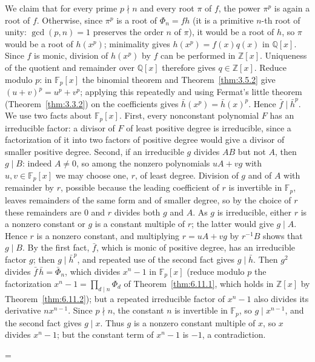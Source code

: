 \documentclass[11pt]{article}
\makeatletter
\let\nt@closedisplay\]
\def\nt@guardedclose{\@ifnextchar\par{\nt@closeafterpar}{\@ifnextchar\end{\postdisplaypenalty\@M\nt@closedisplay}{\nt@closedisplay}}}
\def\nt@closeafterpar\par{\@ifnextchar\par{\nt@closeafterpar}{\@ifnextchar\end{\postdisplaypenalty\@M\nt@closedisplay\par}{\nt@closedisplay\par}}}
\renewenvironment{proof}[1][\proofname]{\par
  \pushQED{\qed}\normalfont\topsep\medskipamount\edef\nt@afterproof{\@endparpenalty=\the\@endparpenalty\relax}\@beginparpenalty\@M\@endparpenalty\@M\let\]\nt@guardedclose\trivlist\item[]\textit{#1\@addpunct{.}} \ignorespaces}{\ifvmode\addpenalty\@M\fi\popQED\nt@afterproof\endtrivlist\@endpefalse}
\theoremstyle{ntstyle}
\makeatother
\begin{document}
\begin{proof}
  We claim that for every prime $p\nmid n$ and every root $\pi$ of $f$,
  the power $\pi^{p}$ is again a root of $f$. Otherwise, since $\pi^{p}$ is a
  root of $\Phi_n = fh$ (it is a primitive $n$-th root of unity:
  $\gcd(p, n) = 1$ preserves the order $n$ of $\pi$), it would be a
  root of $h$, so $\pi$ would be a root of $h(x^{p})$; minimality
  gives $h(x^{p})=f(x)q(x)$ in $\mathbb{Q}[x]$. Since $f$ is monic,
  division of $h(x^p)$ by $f$ can be performed in $\mathbb{Z}[x]$.
  Uniqueness of the quotient and remainder over $\mathbb{Q}[x]$ therefore
  gives $q\in\mathbb{Z}[x]$. Reduce modulo $p$:
  in $\mathbb{F}_p[x]$ the binomial theorem and
  Theorem~\ref{thm:3.5.2} give $(u+v)^p=u^p+v^p$; applying this repeatedly
  and using Fermat's little theorem (Theorem~\ref{thm:3.3.2}) on the
  coefficients gives $\bar h(x^{p}) = \bar h(x)^{p}$. Hence
  $\bar f\mid\bar h^{p}$. We use two facts about $\mathbb{F}_p[x]$.
  First, every nonconstant polynomial $F$ has an irreducible factor: a
  divisor of $F$ of least positive degree is irreducible, since a
  factorization of it into two factors of positive degree would give a
  divisor of smaller positive degree. Second, if an irreducible $g$
  divides $AB$ but not $A$, then $g\mid B$: indeed $A\neq0$, so among the
  nonzero polynomials $uA+vg$ with $u,v\in\mathbb{F}_p[x]$ we may choose
  one, $r$, of least degree. Division of $g$ and of $A$ with remainder by $r$, possible
  because the leading coefficient of $r$ is invertible in $\mathbb{F}_p$,
  leaves remainders of the same form and of smaller degree, so by the
  choice of $r$ these remainders are $0$ and $r$ divides both $g$ and $A$. As $g$ is
  irreducible, either $r$ is a nonzero constant or $g$ is a constant
  multiple of $r$; the latter would give $g\mid A$. Hence $r$ is a nonzero
  constant, and multiplying $r=uA+vg$ by $r^{-1}B$ shows that
  $g\mid B$. By the first fact, $\bar f$, which is monic of positive
  degree, has an irreducible factor $g$; then $g\mid\bar h^{p}$, and
  repeated use of the second fact gives $g\mid\bar h$. Then $g^2$
  divides $\bar f\,\bar h = \bar\Phi_n$, which divides $x^{n} - 1$ in
  $\mathbb{F}_p[x]$ (reduce modulo $p$ the factorization $x^n-1=\prod_{d\mid n}\Phi_d$ of Theorem~\ref{thm:6.11.1},
  which holds in $\mathbb{Z}[x]$ by Theorem~\ref{thm:6.11.2}); but a repeated irreducible factor of $x^{n} - 1$
  also divides its derivative $nx^{n-1}$. Since $p\nmid n$, the constant
  $n$ is invertible in $\mathbb{F}_p$, so $g\mid x^{n-1}$, and the second
  fact gives $g\mid x$. Thus $g$ is a nonzero constant multiple of $x$, so $x$ divides $x^n-1$; but the constant
  term of $x^n-1$ is $-1$, a contradiction.


\end{proof}
\end{document}
